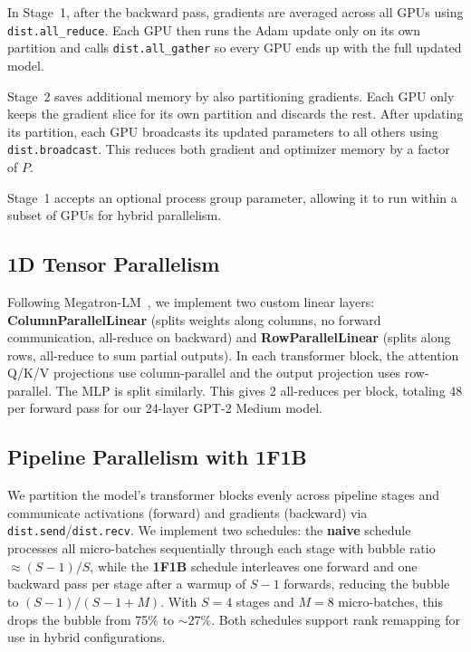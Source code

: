 \documentclass[conference]{IEEEtran}
\begin{document}
In Stage~1, after the backward pass, gradients are averaged across all GPUs using \texttt{dist.all\_reduce}. Each GPU then runs the Adam update only on its own partition and calls \texttt{dist.all\_gather} so every GPU ends up with the full updated model.

Stage~2 saves additional memory by also partitioning gradients. Each GPU only keeps the gradient slice for its own partition and discards the rest. After updating its partition, each GPU broadcasts its updated parameters to all others using \texttt{dist.broadcast}. This reduces both gradient and optimizer memory by a factor of $P$.

Stage~1 accepts an optional process group parameter, allowing it to run within a subset of GPUs for hybrid parallelism.

\subsection{1D Tensor Parallelism}

Following Megatron-LM~\cite{DBLP:journals/corr/abs-1909-08053}, we implement two custom linear layers: \textbf{ColumnParallelLinear} (splits weights along columns, no forward communication, all-reduce on backward) and \textbf{RowParallelLinear} (splits along rows, all-reduce to sum partial outputs). In each transformer block, the attention Q/K/V projections use column-parallel and the output projection uses row-parallel. The MLP is split similarly. This gives 2 all-reduces per block, totaling 48 per forward pass for our 24-layer GPT-2 Medium model.

\subsection{Pipeline Parallelism with 1F1B}

We partition the model's transformer blocks evenly across pipeline stages and communicate activations (forward) and gradients (backward) via \texttt{dist.send}/\texttt{dist.recv}. We implement two schedules: the \textbf{naive} schedule processes all micro-batches sequentially through each stage with bubble ratio $\approx (S{-}1)/S$, while the \textbf{1F1B} schedule interleaves one forward and one backward pass per stage after a warmup of $S{-}1$ forwards, reducing the bubble to $(S{-}1)/(S{-}1+M)$. With $S=4$ stages and $M=8$ micro-batches, this drops the bubble from 75\% to $\sim$27\%. Both schedules support rank remapping for use in hybrid configurations.
\end{document}
